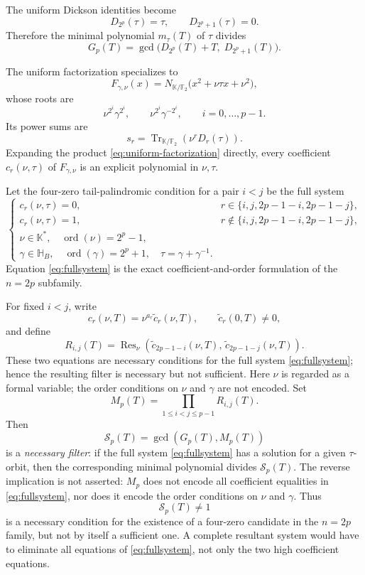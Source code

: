 \documentclass[11pt]{article}
\theoremstyle{definition}
\theoremstyle{remark}
\begin{document}
The uniform Dickson identities become
\[
D_{2^p}(\tau)=\tau,
\qquad
D_{2^p+1}(\tau)=0.
\]
Therefore the minimal polynomial \(m_\tau(T)\) of \(\tau\) divides
\begin{equation}\label{eq:Gp}
G_p(T)=\gcd\bigl(D_{2^p}(T)+T,\;D_{2^p+1}(T)\bigr).
\end{equation}

The uniform factorization specializes to
\[
F_{\gamma,\nu}(x)
=
N_{\mathbb K/\mathbb F_2}\bigl(x^2+\nu\tau x+\nu^2\bigr),
\]
whose roots are
\[
\nu^{2^i}\gamma^{2^i},\qquad \nu^{2^i}\gamma^{-2^i},
\qquad i=0,\ldots,p-1.
\]
Its power sums are
\begin{equation}\label{eq:powersum}
s_r
=
\operatorname{Tr}_{\mathbb K/\mathbb F_2}
\left(\nu^rD_r(\tau)\right).
\end{equation}
Expanding the product \eqref{eq:uniform-factorization} directly, every coefficient \(c_r(\nu,\tau)\) of \(F_{\gamma,\nu}\) is an explicit polynomial in \(\nu,\tau\).

Let the four-zero tail-palindromic condition for a pair $i<j$ be the full system
\begin{equation}\label{eq:fullsystem}
\begin{cases}
c_r(\nu,\tau)=0, & r\in\{i,j,2p-1-i,2p-1-j\},\\
c_r(\nu,\tau)=1, & r\notin\{i,j,2p-1-i,2p-1-j\},\\
\nu\in\mathbb K^*,\quad \operatorname{ord}(\nu)=2^p-1,\\
\gamma\in\mathbb H_B,\quad \operatorname{ord}(\gamma)=2^p+1,\quad \tau=\gamma+\gamma^{-1}.
\end{cases}
\end{equation}
Equation \eqref{eq:fullsystem} is the exact coefficient-and-order formulation of the $n=2p$ subfamily.

For fixed $i<j$, write
\[
c_r(\nu,T)=\nu^{a_r}\tilde c_r(\nu,T),\qquad \tilde c_r(0,T)\neq0,
\]
and define
\[
R_{i,j}(T)=\operatorname{Res}_{\nu}
\left(\tilde c_{2p-1-i}(\nu,T),\,\tilde c_{2p-1-j}(\nu,T)\right).
\]
These two equations are necessary conditions for the full system \eqref{eq:fullsystem}; hence the resulting filter is necessary but not sufficient. Here \(\nu\) is regarded as a formal variable; the order conditions on \(\nu\) and \(\gamma\) are not encoded.
Set
\[
M_p(T)=\prod_{1\le i<j\le p-1}R_{i,j}(T).
\]
Then
\[
\mathcal S_p(T)=\gcd(G_p(T),M_p(T))
\]
is a \emph{necessary filter}: if the full system \eqref{eq:fullsystem} has a solution for a given $\tau$-orbit, then the corresponding minimal polynomial divides $\mathcal S_p(T)$. The reverse implication is not asserted: $M_p$ does not encode all coefficient equalities in \eqref{eq:fullsystem}, nor does it encode the order conditions on $\nu$ and $\gamma$. Thus
\[
\mathcal S_p(T)\neq1
\]
is a necessary condition for the existence of a four-zero candidate in the $n=2p$ family, but not by itself a sufficient one. A complete resultant system would have to eliminate all equations of \eqref{eq:fullsystem}, not only the two high coefficient equations.
\end{document}
